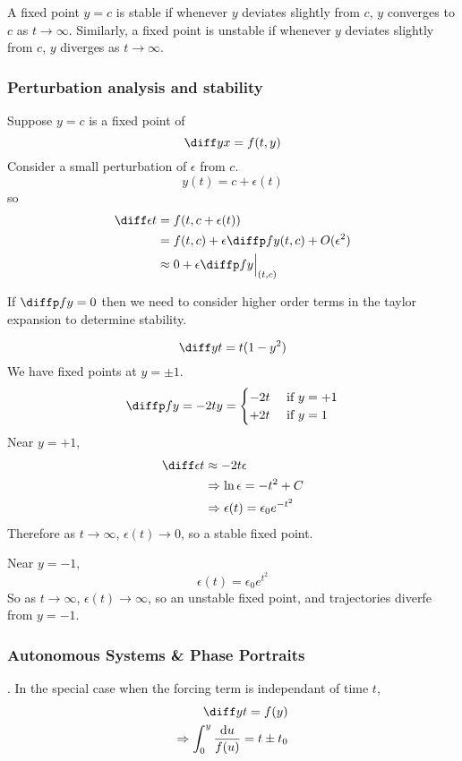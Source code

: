\documentclass{article}
\begin{document}
\begin{defi}
    A fixed point $y = c$ is stable if whenever $y$ deviates slightly from $c$, $y$ converges to $c$ as $t \rightarrow \infty$.
    Similarly, a fixed point is unstable if whenever $y$ deviates slightly from $c$, $y$ diverges as $t \rightarrow \infty$.
\end{defi}
\subsubsection{Perturbation analysis and stability}
Suppose $y = c$ is a fixed point of 
\[
    \diff yx = f(t, y)
\]
Consider a small perturbation of $\epsilon$ from $c$.
\[
    y(t) = c + \epsilon(t)
\]
so
\begin{align*}
    \diff \epsilon t &= f(t, c + \epsilon(t)) \\
    &= f(t, c) + \epsilon \diffp fy (t, c) + O(\epsilon^2) \\
    &\approx 0 + \epsilon \diffp fy \eval_{(t, c)}{}
\end{align*}
\begin{remark}
    If $\diffp fy = 0$ then we need to consider higher order terms in the taylor expansion to determine stability.
\end{remark}
\begin{eg}
    \[
        \diff yt = t(1 - y^2)
    \]
    We have fixed points at $y = \pm 1$.
    \[
        \diffp fy = -2ty = \begin{cases}
            -2t & \text{ if } y = + 1 \\
            +2t & \text{ if } y = 1
        \end{cases}  
    \]
    Near $y = +1$,
    \begin{align*}
        \diff \epsilon t &\approx -2t \epsilon \\
        &\Rightarrow \ln \epsilon = - t^2 + C  \\
        &\Rightarrow \epsilon(t) = \epsilon_0 e^{-t^2}
    \end{align*}
    Therefore as $t \rightarrow \infty$, $\epsilon(t) \rightarrow 0$, so a stable fixed point.

    Near $y = -1$, 
    \[  
        \epsilon(t) = \epsilon_0 e^{t^2}
    \]
    So as $t \rightarrow \infty$, $\epsilon(t) \rightarrow \infty$, so an unstable fixed point,
    and trajectories diverfe from $y = -1$.
\end{eg}

\subsubsection{Autonomous Systems \& Phase Portraits}.
In the special case when the forcing term is independant of time $t$,
\begin{align*}
    \diff yt = f(y) \\
    \Rightarrow \int_{0}^{y}{\frac{\diffd u}{f(u)}} = t \pm t_0
\end{align*}
\end{document}
